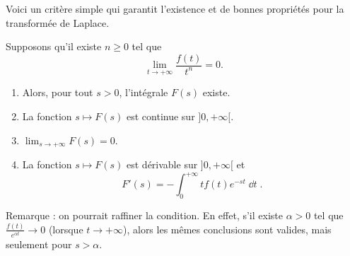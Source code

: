 \documentclass[class=report,crop=false]{standalone}
\begin{document}
Voici un critère simple qui garantit l'existence 
et de bonnes propriétés pour la transformée de Laplace.
\begin{proposition}
\label{prop:laplace1}
Supposons qu'il existe $n \ge 0$ tel que
$$\lim_{t\to+\infty} \frac{f(t)}{t^n} = 0.$$
\begin{enumerate}
  \item Alors, pour tout $s>0$, l'intégrale $F(s)$ existe. 
  
  \item La fonction $s \mapsto F(s)$ est continue sur $]0,+\infty[$.
  
  \item $\lim_{s\to+\infty} F(s) = 0$.
  
  \item La fonction $s \mapsto F(s)$ est dérivable sur $]0,+\infty[$
  et 
  $$F'(s) = -\int_0^{+\infty} tf(t) e^{-st}\;\dd t\;.$$
\end{enumerate}

\end{proposition}

Remarque : on pourrait raffiner la condition. En effet, s'il existe
$\alpha > 0$ tel que $\frac{f(t)}{e^{\alpha t}} \to 0$ (lorsque $t\to +\infty$),
alors les mêmes conclusions sont valides, mais seulement pour $s>\alpha$.
\end{document}
